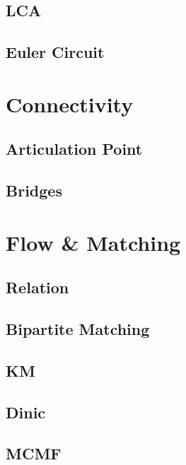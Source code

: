     \subsection{LCA}
        
    \subsection{Euler Circuit}
        

\section{Connectivity}
    \subsection{Articulation Point}
        
    \subsection{Bridges}
        

\section{Flow \& Matching}
    \subsection{Relation}
        
    \subsection{Bipartite Matching}
        
    \subsection{KM}
        
    \subsection{Dinic}
        
    \subsection{MCMF}
        

